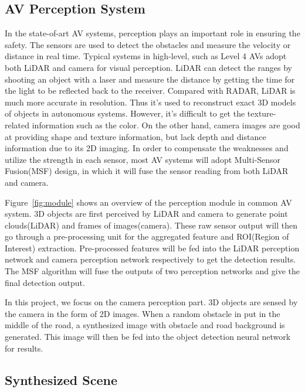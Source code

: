 
\subsection{AV Perception System}

In the state-of-art AV systems, perception plays an important role in ensuring the safety. 
The sensors are used to detect the obstacles and measure the velocity or distance in real time. 
Typical systems in high-level, such as Level 4\cite{level4} AVs adopt both LiDAR and camera for visual perception.
LiDAR\cite{lidar} can detect the ranges by shooting an object with a laser and measure the distance by getting the time for the light to be reflected back to the receiver.
Compared with RADAR, LiDAR is much more accurate in resolution.
Thus it's used to reconstruct exact 3D models of objects in autonomous systems.
However, it's difficult to get the texture-related information such as the color\cite{lidar-text}. 
On the other hand, camera images are good at providing shape and texture information, but lack depth and distance information due to its 2D imaging.
In order to compensate the weaknesses and utilize the strength in each sensor, most AV systems will adopt Multi-Sensor Fusion(MSF) design, 
in which it will fuse the sensor reading from both LiDAR and camera.

Figure~\ref{fig:module} shows an overview of the perception module in common AV system\cite{apollo}.
3D objects are first perceived by LiDAR and camera to generate point clouds(LiDAR) and frames of images(camera).
These raw sensor output will then go through a pre-processing unit for the aggregated feature and ROI(Region of Interest) extraction.
Pre-processed features will be fed into the LiDAR perception network and camera perception network respectively to get the detection results.
The MSF algorithm will fuse the outputs of two perception networks and give the final detection output.

In this project, we focus on the camera perception part. 
3D objects are sensed by the camera in the form of 2D images. 
When a random obstacle in put in the middle of the road, a synthesized image with obstacle and road background is generated.
This image will then be fed into the object detection neural network for results.

\subsection{Synthesized Scene}

